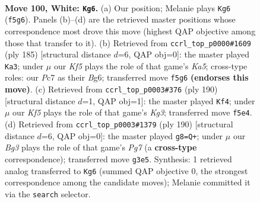\documentclass[11pt]{article}
\begin{document}
\clearpage

\begin{figure}[p]\centering
\begin{subfigure}{0.46\textwidth}\centering
\resizebox{\linewidth}{!}{%
\newchessgame
\chessboard[
  setfen={6k1/2P5/8/5K2/8/6B1/8/8 w - - 25 100},
  showmover=false,
  pgfstyle=straightmove, color=movearrow, markmove={f5-g6}
]}
\caption{}
\end{subfigure}\hfill
\begin{subfigure}{0.46\textwidth}\centering
\resizebox{\linewidth}{!}{%
\newchessgame
\chessboard[
  setfen={8/8/6b1/8/k7/8/8/B1K5 b - - 7 93},
  showmover=false,
  pgfstyle=straightmove, color=movearrow, markmove={a4-a3}
]}
\caption{}
\end{subfigure}
\\[4pt]
\begin{subfigure}{0.46\textwidth}\centering
\resizebox{\linewidth}{!}{%
\newchessgame
\chessboard[
  setfen={7k/8/6P1/8/8/3B2K1/8/8 w - - 1 96},
  showmover=false,
  pgfstyle=straightmove, color=movearrow, markmove={g3-f4}
]}
\caption{}
\end{subfigure}\hfill
\begin{subfigure}{0.46\textwidth}\centering
\resizebox{\linewidth}{!}{%
\newchessgame
\chessboard[
  setfen={8/6PK/4k3/8/8/8/8/8 w - - 3 96},
  showmover=false,
  pgfstyle=straightmove, color=movearrow, markmove={g7-g8}
]}
\caption{}
\end{subfigure}
\caption{\textbf{Move 100, White: \texttt{Kg6}.} (a) Our position; Melanie plays \texttt{Kg6} (\texttt{f5g6}). Panels (b)--(d) are the retrieved master positions whose correspondence most drove this move (highest QAP objective among those that transfer to it). (b) Retrieved from \texttt{ccrl\_top\_p0000\#1609} (ply 185) [structural distance $d$=6, QAP obj=0]: the master played \texttt{Ka3}; under $\mu$ our \emph{Kf5} plays the role of that game's \emph{Ka5}; cross-type roles: our \emph{P}c7 as their \emph{B}g6; transferred move \texttt{f5g6} \textbf{(endorses this move)}. (c) Retrieved from \texttt{ccrl\_top\_p0003\#376} (ply 190) [structural distance $d$=1, QAP obj=1]: the master played \texttt{Kf4}; under $\mu$ our \emph{Kf5} plays the role of that game's \emph{Kg3}; transferred move \texttt{f5e4}. (d) Retrieved from \texttt{ccrl\_top\_p0003\#1379} (ply 190) [structural distance $d$=6, QAP obj=0]: the master played \texttt{g8=Q+}; under $\mu$ our \emph{Bg3} plays the role of that game's \emph{Pg7} (a \textbf{cross-type} correspondence); transferred move \texttt{g3e5}. Synthesis: 1 retrieved analog transferred to \texttt{Kg6} (summed QAP objective 0, the strongest correspondence among the candidate moves); Melanie committed it via the \texttt{search} selector.}
\label{fig:thought-m198}
\end{figure}
\end{document}
